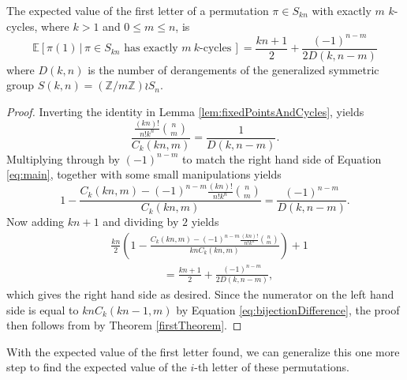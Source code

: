 \begin{theorem}
  \label{secondTheorem}
  The expected value of the first letter of a permutation
  $\pi \in S_{kn}$ with exactly $m$ $k$-cycles, where $k > 1$ and $0 \leq m \leq n$, is
  \begin{equation}
    \label{eq:main}
    \mathbb{E}[\pi(1)\, |\, \pi \in S_{kn} \text{ has exactly } m\ k \text{-cycles}\,] =
    \frac{kn + 1}{2} + \frac{(-1)^{n-m}}{2 D(k, n - m)}
  \end{equation}
  where $D(k, n)$ is the number of derangements of the generalized symmetric
  group $S(k, n) = (\mathbb{Z}/m\mathbb{Z}) \wr S_n$.
\end{theorem}
\begin{proof}
  Inverting the identity in Lemma \ref{lem:fixedPointsAndCycles}, yields \begin{equation}
    \frac{\frac{(kn)!}{n!k^n}\binom n m}{C_k(kn, m)}
    = \frac{1}{D(k, n - m)}.
  \end{equation}
  Multiplying through by $(-1)^{n - m}$ to match the right hand side of Equation
  \ref{eq:main}, together with some small manipulations yields \begin{equation}
    1 - \frac{C_k(kn, m) - (-1)^{n - m}\frac{(kn)!}{n!k^n}\binom n m}{C_k(kn, m)}
    = \frac{(-1)^{n-m}}{D(k, n - m)}.
  \end{equation}
  Now adding $kn + 1$ and dividing by $2$ yields \begin{align}
    &\frac{kn}{2}\left(1 - \frac{C_k(kn, m) - (-1)^{n - m}\frac{(kn)!}{n!k^n}\binom n m}{knC_k(kn, m)}\right) + 1
    \nonumber
    \\
    & \hspace{2cm} = \frac{kn+1}{2} + \frac{(-1)^{n-m}}{2 D(k, n - m)},
  \end{align}
  which gives the right hand side as desired.
  Since the numerator on the left hand
  side is equal to ${kn C_k(kn - 1, m)}$ by Equation \ref{eq:bijectionDifference},
  the proof then follows from by Theorem \ref{firstTheorem}.
\end{proof}

With the expected value of the first letter found,
we can generalize this one more step to find the expected value of the
$i$-th letter of these permutations.

